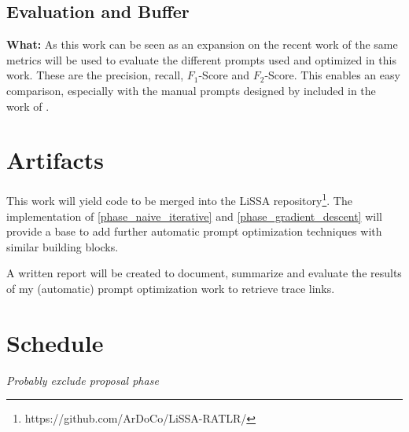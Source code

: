 \subsection{Evaluation and Buffer}
\label{phase_evaluation}
\textbf{What:} As this work can be seen as an expansion on the recent work of  the same metrics will be used to evaluate the different prompts used and optimized in this work. These are the precision, recall, $F_1$-Score and $F_2$-Score. This enables an easy comparison, especially with the manual prompts designed by  included in the work of \citeauthor{fuchss2025LiSSAGeneric}.









\section{Artifacts}
This work will yield code to be merged into the LiSSA repository\footnote{https://github.com/ArDoCo/LiSSA-RATLR/}. The implementation of \ref{phase_naive_iterative} and \ref{phase_gradient_descent} will provide a base to add further automatic prompt optimization techniques with similar building blocks.

A written report will be created to document, summarize and evaluate the results of my (automatic) prompt optimization work to retrieve trace links.

\section{Schedule}
\textit{Probably exclude proposal phase}


